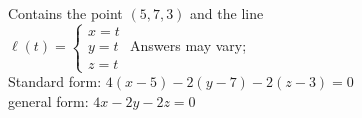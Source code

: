 {Contains the point $(5,7,3)$ and the line\\
$\ell(t) = \begin{cases}x=t\\y=t\\z=t\end{cases}$
}
{Answers may vary;\\
Standard form: $4(x-5)-2(y-7)-2(z-3)=0$\\
general form: $4x-2y-2z=0$
}

